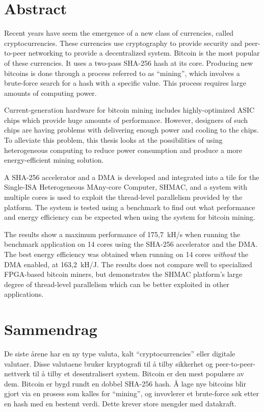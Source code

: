 \chapter*{Abstract}

Recent years have seem the emergence of a new class of currencies, called
cryptocurrencies. These currencies use cryptography to provide security
and peer-to-peer networking to provide a decentralized system. Bitcoin is
the most popular of these currencies. It uses a two-pass
SHA-256 hash at its core. Producing new bitcoins is done through a process
referred to as ``mining'', which involves a brute-force search for a hash with
a specific value. This process requires large amounts of computing power.

Current-generation hardware for bitcoin mining includes highly-optimized
ASIC chips which provide huge amounts of performance. However, designers of
such chips are having problems with delivering enough power and cooling
to the chips. To alleviate this problem, this thesis looks at the possibilities
of using heterogeneous computing to reduce power consumption and produce a more
energy-efficient mining solution.

A SHA-256 accelerator and a DMA is developed and integrated into a tile for
the Single-ISA Heterogeneous MAny-core Computer, SHMAC, and a system with
multiple cores is used to exploit the thread-level parallelism provided by
the platform. The system is tested using a benchmark to find out what performance
and energy efficiency can be expected when using the system for bitcoin mining.

The results show a maximum performance of 175,7~kH/s when running the benchmark
application on 14 cores using the SHA-256 accelerator and the DMA. The best
energy efficiency was obtained when running on 14 cores \emph{without} the DMA enabled,
at 163,2~kH/J. The results does not compare well to specialized FPGA-based
bitcoin miners, but demonstrates the SHMAC platform's large degree of thread-level parallelism
which can be better exploited in other applications.

\chapter*{Sammendrag}

De siste årene har en ny type valuta, kalt ``cryptocurrencies'' eller digitale valutaer. Disse valutaene
bruker kryptografi til å tilby sikkerhet og peer-to-peer-nettverk til å tilby et
desentralisert system. Bitcoin er den mest populære av dem. Bitcoin er bygd rundt
en dobbel SHA-256 hash. Å lage nye bitcoins blir gjort via en prosess som kalles
for ``mining'', og invovlerer et brute-force søk etter en hash med en bestemt verdi.
Dette krever store mengder med datakraft.

